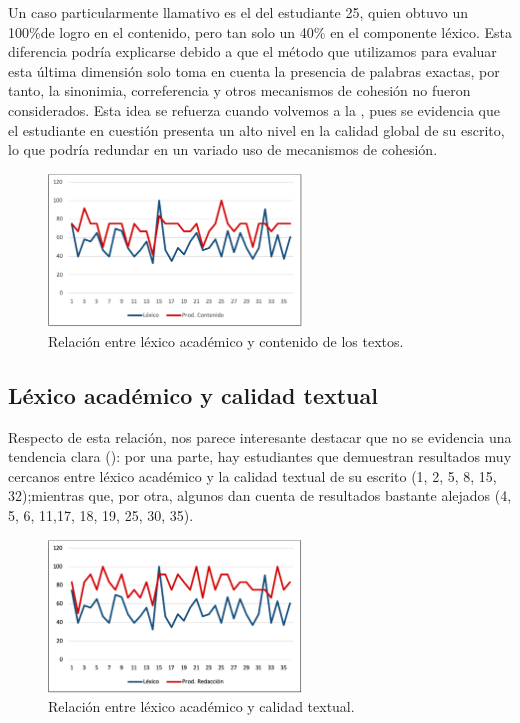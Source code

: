 \documentclass{textolivre}
\begin{document}
Un caso particularmente llamativo es el del estudiante 25, quien obtuvo un
100\%de logro en el contenido, pero tan solo un 40\% en el componente léxico.
Esta diferencia podría explicarse debido a que el método que utilizamos para
evaluar esta última dimensión solo toma en cuenta la presencia de palabras
exactas, por tanto, la sinonimia, correferencia y otros mecanismos de cohesión
no fueron considerados. Esta idea se refuerza cuando volvemos a la ,
pues se evidencia que el estudiante en cuestión presenta un alto nivel en la
calidad global de su escrito, lo que podría redundar en un variado uso de
mecanismos de cohesión.

\begin{figure}[htbp]
 \centering
 \includegraphics[width=0.6\textwidth]{figure03.pdf}
 \caption{Relación entre léxico académico y contenido de los textos.}
 \label{fig03}
\end{figure}


\subsection{Léxico académico y calidad textual}\label{sec-calidad}
Respecto de esta relación, nos parece interesante destacar que no se
evidencia una tendencia clara (): por una parte, hay estudiantes que
demuestran resultados muy cercanos entre léxico académico y la calidad textual
de su escrito (1, 2, 5, 8, 15, 32);mientras que, por otra, algunos dan cuenta
de resultados bastante alejados (4, 5, 6, 11,17, 18, 19, 25, 30, 35).

\begin{figure}[htbp]
 \centering
 \includegraphics[width=0.6\textwidth]{figure04.pdf}
 \caption{Relación entre léxico académico y calidad textual.}
 \label{fig04}
\end{figure}
\end{document}

